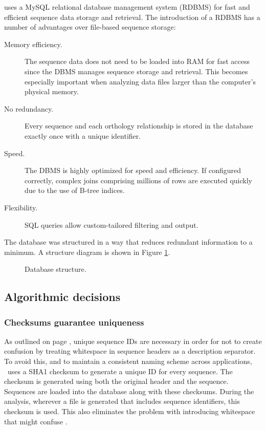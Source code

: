 \pname uses a MySQL relational database management system (RDBMS) for fast and
efficient sequence data storage and retrieval. The introduction of a RDBMS has a
number of advantages over file-based sequence storage:

\begin{description}
	\item[Memory efficiency.] The sequence data does not need to be loaded into
		RAM for fast access since the DBMS manages sequence storage and retrieval.
		This becomes especially important when analyzing data files larger than the
		computer's physical memory.
	\item[No redundancy.] Every sequence and each orthology relationship is stored
		in the database exactly once with a unique identifier. 
	\item[Speed.] The DBMS is highly optimized for speed and efficiency. If
		configured correctly, complex joins comprising millions of rows are
		executed quickly due to the use of B-tree indices.  %
	\item[Flexibility.] SQL queries allow custom-tailored filtering and output.
\end{description}

The database was structured in a way that reduces redundant information to a
minimum. A structure diagram is shown in Figure \ref{fig:dbstructure}.

\begin{figure}[ht]
	\begin{center}
	\end{center}
	\caption{Database structure.}
	\label{fig:dbstructure}
\end{figure}

\subsection{Algorithmic decisions}

\subsubsection{Checksums guarantee uniqueness}

As outlined on page \pageref{uniq}, unique sequence IDs are necessary in
order for  not to create confusion by treating whitespace in
sequence headers as a description separator. To avoid this, and to maintain a
consistent naming scheme across applications, \pname~uses a SHA1 checksum to
generate a unique ID for every sequence. The checksum is generated using both
the original header and the sequence. Sequences are loaded into the database
along with these checksums. During the analysis, wherever a file is generated
that includes sequence identifiers, this checksum is used. This also eliminates
the problem with  introducing whitespace that might confuse
.

